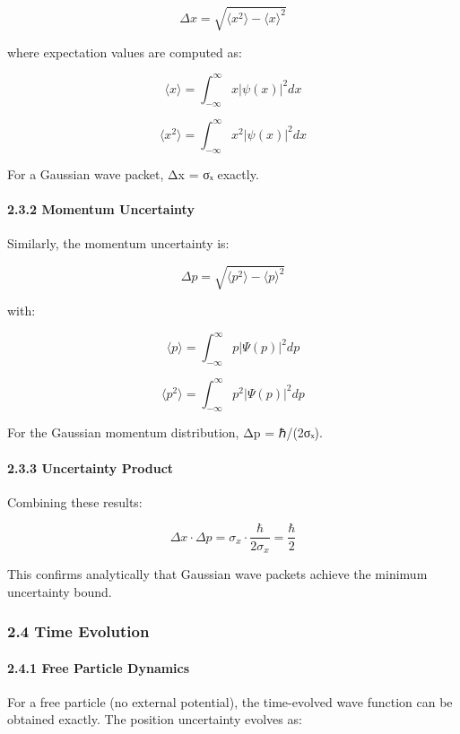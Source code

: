 \documentclass[
]{article}
\begin{document}
\[\Delta x = \sqrt{\langle x^2 \rangle - \langle x \rangle^2}\]

where expectation values are computed as:

\[\langle x \rangle = \int_{-\infty}^{\infty} x|\psi(x)|^2 dx\]

\[\langle x^2 \rangle = \int_{-\infty}^{\infty} x^2|\psi(x)|^2 dx\]

For a Gaussian wave packet, Δx = σₓ exactly.

\paragraph{2.3.2 Momentum Uncertainty}\label{momentum-uncertainty}

Similarly, the momentum uncertainty is:

\[\Delta p = \sqrt{\langle p^2 \rangle - \langle p \rangle^2}\]

with:

\[\langle p \rangle = \int_{-\infty}^{\infty} p|\Psi(p)|^2 dp\]

\[\langle p^2 \rangle = \int_{-\infty}^{\infty} p^2|\Psi(p)|^2 dp\]

For the Gaussian momentum distribution, Δp = ℏ/(2σₓ).

\paragraph{2.3.3 Uncertainty Product}\label{uncertainty-product}

Combining these results:

\[\Delta x \cdot \Delta p = \sigma_x \cdot \frac{\hbar}{2\sigma_x} = \frac{\hbar}{2}\]

This confirms analytically that Gaussian wave packets achieve the
minimum uncertainty bound.

\subsubsection{2.4 Time Evolution}\label{time-evolution}

\paragraph{2.4.1 Free Particle Dynamics}\label{free-particle-dynamics}

For a free particle (no external potential), the time-evolved wave
function can be obtained exactly. The position uncertainty evolves as:
\end{document}

